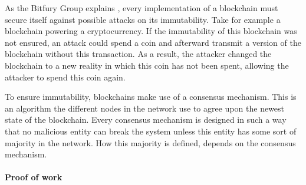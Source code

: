 \iffalse
- need to secure against attacks on the immutability of its blockchain. otherwise, eg. considering a cryptocurrency system, an attacker could spend a coin and afterwards nullify this transaction by transmitting their own version of the blockchain without the spent transaction

- what are consensus mechansisms
\fi

As the Bitfury Group explains \cite{bitfury-pos-vs-pow}, every implementation of a blockchain must secure itself against possible attacks on its immutability. Take for example a blockchain powering a cryptocurrency. If the immutability of this blockchain was not ensured, an attack could spend a coin and afterward transmit a version of the blockchain without this transaction. As a result, the attacker changed the blockchain to a new reality in which this coin has not been spent, allowing the attacker to spend this coin again.

To ensure immutability, blockchains make use of a consensus mechanism. This is an algorithm the different nodes in the network use to agree upon the newest state of the blockchain. Every consensus mechanism is designed in such a way that no malicious entity can break the system unless this entity has some sort of majority in the network. How this majority is defined, depends on the consensus mechanism.

\iffalse
every consensus mechansism: 
- what is needed to suggest a new block
- how does this prevent 
- what are advantages and disadvantages
\fi

\paragraph{Proof of work}

\iffalse
- to suggest a new block, an entity needs to solve a random computational problem. This problem is designed as such that this entity, called the miner, has a chance of p%

- As the Bitfury Group correctly states \cite{bitfury-pos-vs-pow}: "[the] security of the network is supported by physically scarce resources: specialized hardware needed to run computations, and electricity spent to power the hardware." 
\fi

